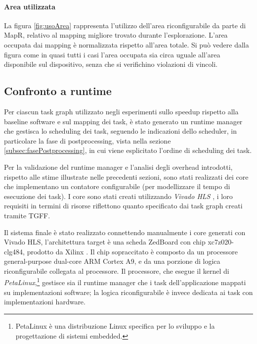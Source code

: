 \paragraph{Area utilizzata}
La figura \ref{fig:usoArea} rappresenta l'utilizzo dell'area
riconfigurabile da parte di MapR, relativo al mapping migliore trovato durante
l'esplorazione. L'area occupata dai mapping \`e normalizzata rispetto all'area totale.
Si pu\`o vedere dalla figura come in quasi tutti i casi l'area occupata sia
circa uguale all'area disponibile sul dispositivo, senza che si verifichino
violazioni di vincoli.



\subsection{Confronto a runtime}
Per ciascun task graph utilizzato negli esperimenti sullo speedup rispetto alla baseline software
e sul mapping dei task, \`e stato generato un runtime manager che gestisca lo scheduling dei task,
seguendo le indicazioni dello scheduler, in particolare la fase di postprocessing, vista nella sezione
\ref{subsec:fasePostprocessing}, in cui viene esplicitato l'ordine di scheduling dei task.

Per la validazione del runtime manager e l'analisi degli overhead introdotti, rispetto alle stime
illustrate nelle precedenti sezioni, sono stati realizzati dei core che implementano un contatore
configurabile (per modellizzare il tempo di esecuzione dei task). I core sono stati creati utilizzando
\emph{Vivado HLS} \cite{VivadoHLS}, i loro requisiti in termini di risorse riflettono quanto
specificato dai task graph creati tramite \ac{TGFF}.

Il sistema finale \`e stato realizzato connettendo manualmente i core generati con Vivado HLS,
l'architettura target \`e una scheda ZedBoard con chip xc7z020-clg484, prodotto da Xilinx
\cite{XilinxZC702}. Il chip sopraccitato \`e composto da un processore general-purpose dual-core
ARM Cortex A9, e da una porzione di logica riconfigurabile collegata al processore.
Il processore, che esegue il kernel di \emph{PetaLinux},\footnote{PetaLinux \`e una distribuzione
Linux specifica per lo sviluppo e la progettazione di sistemi embedded.} gestisce
sia il runtime manager che i task dell'applicazione mappati su implementazioni software;
la logica riconfigurabile \`e invece dedicata ai task con implementazioni hardware.

